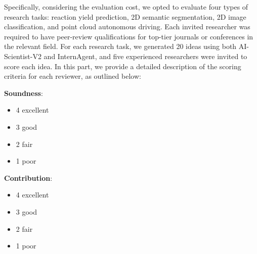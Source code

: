 \documentclass{article}
\begin{document}
Specifically, considering the evaluation cost, we opted to evaluate four types of research tasks: reaction yield prediction, 2D semantic segmentation, 2D image classification, and point cloud autonomous driving. Each invited researcher was required to have peer-review qualifications for top-tier journals or conferences in the relevant field. For each research task, we generated 20 ideas using both AI-Scientist-V2 and InternAgent, and five experienced researchers were invited to score each idea. In this part, we provide a detailed description of the scoring criteria for each reviewer, as outlined below:

\textbf{Soundness}:
\begin{itemize}
  \item 4 excellent
  \item  3 good
  \item  2 fair
  \item  1 poor
\end{itemize}

\textbf{Contribution}:
\begin{itemize}
  \item 4 excellent
  \item  3 good
  \item  2 fair
  \item  1 poor
\end{itemize}
\end{document}
